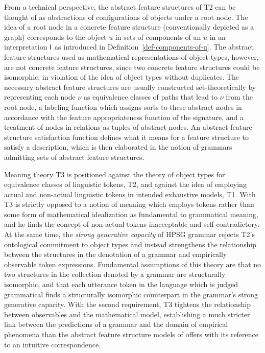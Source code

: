 \documentclass[output=paper
                ,modfonts
                ,nonflat
	        ,collection
	        ,collectionchapter
	        ,collectiontoclongg
 	        ,biblatex
                ,babelshorthands
                ,newtxmath
                ,draftmode
                ,colorlinks, citecolor=brown
]{./langsci/langscibook}
\begin{document}
{{From a technical perspective, the abstract feature structures of T2
can be thought of as abstractions of configurations of objects under a
root node. The idea of a root node in a concrete feature structure
(conventionally depicted as a graph) corresponds to the object
$u$ in sets of components of an $u$ in an interpretation $\mathsf{I}$ as
introduced in Definition~\ref{def-components-of-u}. The abstract
feature structures used as mathematical representations of object
types, however, are not concrete feature structures, since two
concrete feature structures could be isomorphic, in violation of the
idea of object types without duplicates. The necessary abstract
feature structures are usually constructed set-theoretically by
representing each node $\nu$ as equivalence classes of paths that lead to
$\nu$ from the root node, a labeling function which assigns sorts to
these abstract nodes in accordance with the feature appropriateness
function of the signature, and a treatment of nodes in relations as
tuples of abstract nodes. An abstract feature structure satisfaction
function defines what it means for a feature structure to satisfy a
description, which is then elaborated in
the notion of grammars admitting sets of abstract
feature structures.

Meaning theory T3 is positioned against the theory of object types for
equivalence classes of linguistic tokens, T2, and against the idea of
employing actual and non-actual linguistic tokens in intended
exhaustive models, T1. With T3 \cite{Pollard99a} is strictly opposed
to a notion of meaning which employs tokens rather than some form
of mathematical idealization as fundamental to grammatical meaning,
and he finds the concept of non-actual tokens inacceptable and
self-contradictory. At the same time, the \emph{strong generative
  capacity} of HPSG grammar rejects T2's ontological commitment to
object types and instead strengthens the relationship between the
structures in the denotation of a grammar and empirically observable
token expressions. Fundamental assumptions of this theory are that no
two structures in the collection denoted by a grammar are structurally
isomorphic, and that each utterance token in the language which is
judged grammatical finds a structurally isomorphic counterpart in the
grammar's strong generative capacity. With the second requirement, T3
tightens the relationship between observables and the mathematical model,
establishing a much stricter link between the predictions of a grammar
and the domain of empirical phenomena than the abstract feature
structure models of \cite{PollardSag1994} offers with its reference
to an intuitive correspondence.

}}
\end{document}
